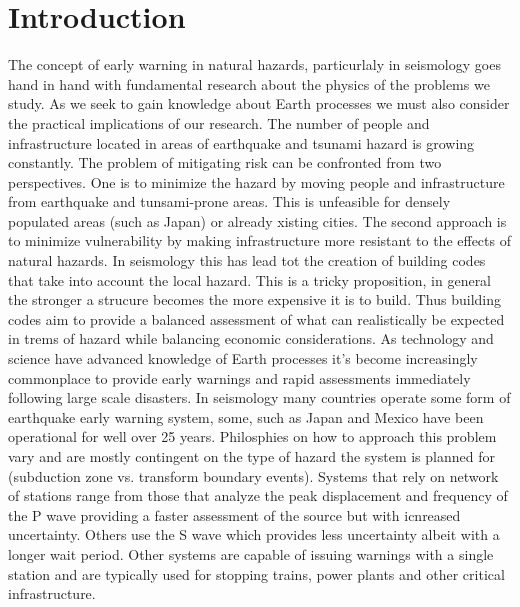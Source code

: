 
\chapter{Introduction}

The concept of early warning in natural hazards, particurlaly in seismology goes hand in hand with fundamental research about the physics of the problems we study. As we seek to gain knowledge about Earth processes we must also consider the practical implications of our research. The number of people and infrastructure located in areas of earthquake and tsunami hazard is growing constantly. The problem of mitigating risk can be confronted from two perspectives. One is to minimize the hazard by moving people and infrastructure from earthquake and tunsami-prone areas. This is unfeasible for densely populated areas (such as Japan) or already xisting cities. The second approach is to minimize vulnerability by making infrastructure more resistant to the effects of natural hazards. In seismology this has lead tot the creation of building codes that take into account the local hazard. This is a tricky proposition, in general the stronger a strucure becomes the more expensive it is to build. Thus building codes aim to provide a balanced assessment of what can realistically be expected in trems of hazard while balancing economic considerations.
	As technology and science have advanced knowledge of Earth processes it's become increasingly commonplace to provide early warnings and rapid assessments immediately following large scale disasters. In seismology many countries operate some form of earthquake early warning \citep{allen2009} system, some, such as Japan and Mexico have been operational for well over 25 years. Philosphies on how to approach this problem vary and are mostly contingent on the type of hazard the system is planned for (subduction zone vs. transform boundary events). Systems that rely on network of stations range from those that analyze the peak displacement and frequency of the P wave \citep{kamigaichi2009} providing a faster assessment of the source but with icnreased uncertainty. Others use the S wave \citep{espinosa2009} which provides less uncertainty albeit with a longer wait period. Other systems are capable of issuing warnings with a single station \citep{nakamura2007} and are typically used for stopping trains, power plants and other critical infrastructure.
